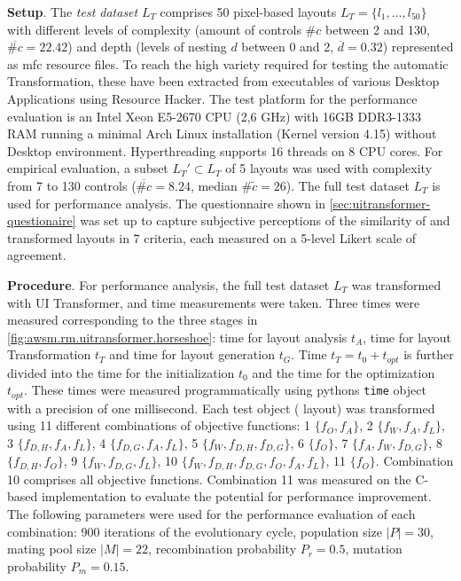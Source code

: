 \textbf{Setup}.
The \emph{test dataset} \(L_T\) comprises 50 pixel-based  layouts \(L_T = \{l_1, \ldots, l_{50}\}\) with different levels of complexity (amount of controls \(\#c\) between 2 and 130, \(\overline{\#c} = 22.42\)) and depth (levels of nesting \(d\) between 0 and 2, \(\overline d = 0.32\)) represented as \gls{mfc} resource files.
To reach the high variety required for testing the automatic \gls{Transformation}, these have been extracted from executables of various \glspl{Desktop Application} using Resource Hacker.
The test platform for the performance evaluation is an Intel Xeon E5-2670 CPU (2,6 GHz) with 16GB DDR3-1333 RAM running a minimal Arch Linux installation (Kernel version 4.15) without Desktop environment.
Hyperthreading supports 16 threads on 8 CPU cores.
For empirical evaluation, a subset \(L_T' \subset L_T\) of 5 layouts was used with complexity from 7 to 130 controls (\(\overline{\#c} = 8.24\), median \(\#\tilde c = 26\)).
The full test dataset \(L_T\) is used for performance analysis.
The questionnaire shown in \cref{sec:uitransformer-questionaire} was set up to capture subjective perceptions of the similarity of  and transformed layouts in 7 criteria, each measured on a 5-level Likert scale of agreement.

\textbf{Procedure}.
For performance analysis, the full test dataset \(L_T\) was transformed with UI Transformer, and time measurements were taken.
Three times were measured corresponding to the three stages in \cref{fig:awsm.rm.uitransformer.horseshoe}: time for layout analysis \(t_A\), time for layout \gls{Transformation} \(t_T\) and time for layout generation \(t_G\).
Time \(t_T= t_0 + t_{opt} \) is further divided into the time for the initialization \(t_{0}\) and the time for the optimization \(t_{opt}\).
These times were measured programmatically using pythons \texttt{time} object with a precision of one millisecond.
Each test object ( layout) was transformed using 11 different combinations of objective functions: 1 \(\{f_O, f_A\}\), 2 \(\{f_W, f_A, f_L\}\), 3 \(\{f_{D,H}, f_A, f_L\}\), 4 \(\{f_{D,G}, f_A, f_L\}\), 5 \(\{f_W, f_{D,H}, f_{D,G}\}\), 6 \(\{f_O\}\), 7 \(\{f_A, f_{W}, f_{D,G}\}\), 8 \(\{f_{D,H}, f_O\}\), 9 \(\{f_W, f_{D,G}, f_L\}\), 10 \(\{f_W, f_{D,H}, f_{D,G}, f_O, f_A, f_L\}\), 11 \(\{f_O\}\).
Combination 10 comprises all objective functions.
Combination 11 was measured on the C-based implementation to evaluate the potential for performance improvement.
The following parameters were used for the performance evaluation of each combination: 900 iterations of the evolutionary cycle, population size \(|P| = 30\), mating pool size \(|M| = 22\), recombination probability \(P_r = 0.5\), mutation probability \(P_m = 0.15\).

